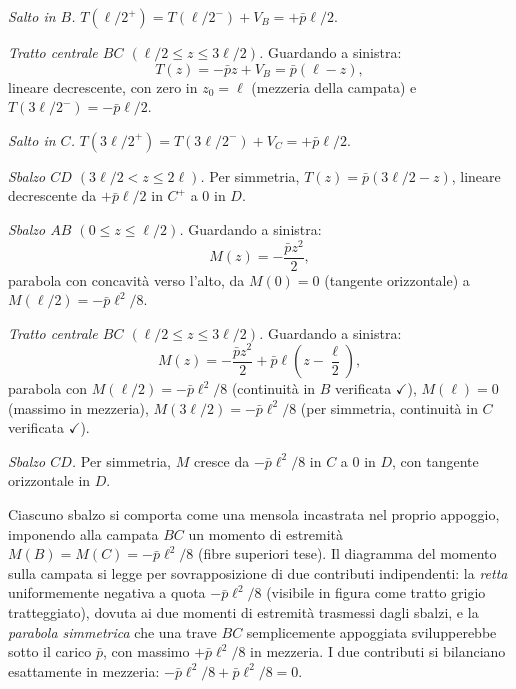 \begin{esempio}
\begin{svolgimento}
		\textit{Salto in $B$.}
		$T(\ell/2^+) = T(\ell/2^-) + V_B = +\bar p\ell/2$.
		
		\textit{Tratto centrale $BC$ $(\ell/2 \leq z \leq 3\ell/2)$.}
		Guardando a sinistra:
		\[
		T(z) = -\bar p z + V_B = \bar p(\ell - z),
		\]
		lineare decrescente, con zero in $z_0 = \ell$
		(mezzeria della campata) e
		$T(3\ell/2^-) = -\bar p\ell/2$.
		
		\textit{Salto in $C$.}
		$T(3\ell/2^+) = T(3\ell/2^-) + V_C = +\bar p\ell/2$.
		
		\textit{Sbalzo $CD$ $(3\ell/2 < z \leq 2\ell)$.}
		Per simmetria, $T(z) = \bar p(3\ell/2 - z)$,
		lineare decrescente da $+\bar p\ell/2$ in $C^+$ a
		$0$ in $D$.
		



		
		
		
		\textit{Sbalzo $AB$ $(0 \leq z \leq \ell/2)$.}
		Guardando a sinistra:
		\[
		M(z) = -\frac{\bar p z^2}{2},
		\]
		parabola con concavità verso l'alto, da $M(0) = 0$
		(tangente orizzontale) a $M(\ell/2) = -\bar p\ell^2/8$.
		
		\textit{Tratto centrale $BC$ $(\ell/2 \leq z \leq 3\ell/2)$.}
		Guardando a sinistra:
		\[
		M(z) = -\frac{\bar p z^2}{2}
		+ \bar p\ell\!\left(z - \frac{\ell}{2}\right),
		\]
		parabola con $M(\ell/2) = -\bar p\ell^2/8$
		(continuità in $B$ verificata $\checkmark$),
		$M(\ell) = 0$ (massimo in mezzeria),
		$M(3\ell/2) = -\bar p\ell^2/8$ (per simmetria,
		continuità in $C$ verificata $\checkmark$).
		
		\textit{Sbalzo $CD$.} Per simmetria, $M$ cresce da
		$-\bar p\ell^2/8$ in $C$ a $0$ in $D$, con tangente
		orizzontale in $D$.
		
		Ciascuno sbalzo si comporta come una mensola
		incastrata nel proprio appoggio, imponendo alla
		campata $BC$ un momento di estremità
		$M(B) = M(C) = -\bar p\ell^2/8$ (fibre superiori
		tese). Il diagramma del momento sulla campata si
		legge per sovrapposizione di due contributi
		indipendenti: la \emph{retta} uniformemente negativa
		a quota $-\bar p\ell^2/8$ (visibile in figura come
		tratto grigio tratteggiato), dovuta ai due momenti
		di estremità trasmessi dagli sbalzi, e la
		\emph{parabola simmetrica} che una trave $BC$
		semplicemente appoggiata svilupperebbe sotto il
		carico $\bar p$, con massimo $+\bar p\ell^2/8$ in
		mezzeria. I due contributi si bilanciano esattamente
		in mezzeria: $-\bar p\ell^2/8 + \bar p\ell^2/8 = 0$.
		

\end{svolgimento}
\end{esempio}
